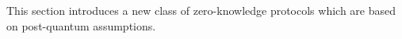 \documentclass[../../../book]{subfiles}
\begin{document}
This section introduces a new class of zero-knowledge protocols which are based
on post-quantum assumptions.

\end{document}
